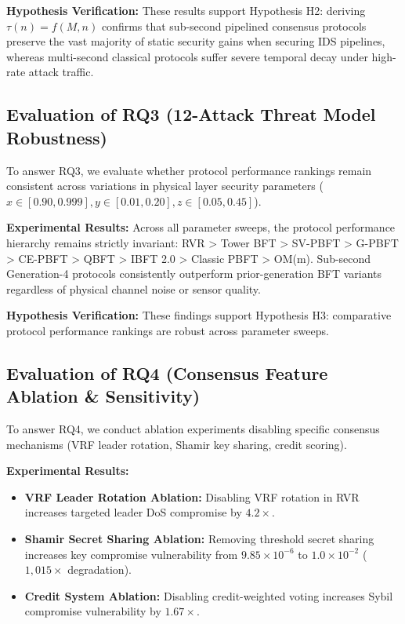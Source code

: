 \documentclass[10pt,twocolumn,journal]{IEEEtran}
\begin{document}
\noindent\textbf{Hypothesis Verification:} These results support Hypothesis H2: deriving $\tau(n) = f(M,n)$ confirms that sub-second pipelined consensus protocols preserve the vast majority of static security gains when securing IDS pipelines, whereas multi-second classical protocols suffer severe temporal decay under high-rate attack traffic.

\subsection{Evaluation of RQ3 (12-Attack Threat Model Robustness)}
To answer RQ3, we evaluate whether protocol performance rankings remain consistent across variations in physical layer security parameters ($x \in [0.90, 0.999], y \in [0.01, 0.20], z \in [0.05, 0.45]$).

\noindent\textbf{Experimental Results:} Across all parameter sweeps, the protocol performance hierarchy remains strictly invariant: RVR > Tower BFT > SV-PBFT > G-PBFT > CE-PBFT > QBFT > IBFT 2.0 > Classic PBFT > OM(m). Sub-second Generation-4 protocols consistently outperform prior-generation BFT variants regardless of physical channel noise or sensor quality.

\noindent\textbf{Hypothesis Verification:} These findings support Hypothesis H3: comparative protocol performance rankings are robust across parameter sweeps.

\subsection{Evaluation of RQ4 (Consensus Feature Ablation & Sensitivity)}
To answer RQ4, we conduct ablation experiments disabling specific consensus mechanisms (VRF leader rotation, Shamir key sharing, credit scoring).

\noindent\textbf{Experimental Results:}
\begin{itemize}[leftmargin=*]
    \item \textbf{VRF Leader Rotation Ablation:} Disabling VRF rotation in RVR increases targeted leader DoS compromise by $4.2\times$.
    \item \textbf{Shamir Secret Sharing Ablation:} Removing threshold secret sharing increases key compromise vulnerability from $9.85 \times 10^{-6}$ to $1.0 \times 10^{-2}$ ($1,015\times$ degradation).
    \item \textbf{Credit System Ablation:} Disabling credit-weighted voting increases Sybil compromise vulnerability by $1.67\times$.
\end{itemize}
\end{document}
